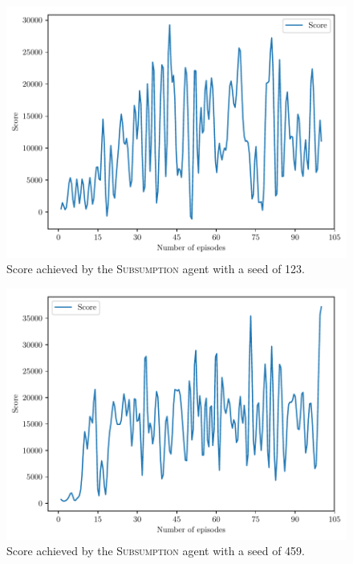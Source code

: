 \documentclass[a4paper,titlepage]{article}
\begin{document}
	\begin{figure}[!htb]
		\centering
		\includegraphics[width=\columnwidth]{plots/seed123.pdf}
		\caption
		{Score achieved by the \textsc{Subsumption} agent with a seed of 123.}
		\label{fig:seed123}
	\end{figure}
	
	\begin{figure}[!htb]
		\centering
		\includegraphics[width=\columnwidth]{plots/seed459.pdf}
		\caption
		{Score achieved by the \textsc{Subsumption} agent with a seed of 459.}
		\label{fig:seed459}
	\end{figure}
\end{document}
